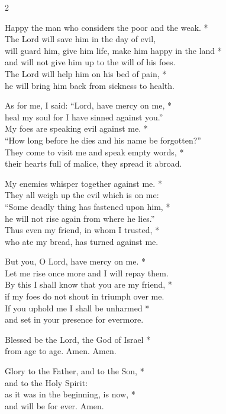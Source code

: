 \begin{multicols}{2}

    Happy the man who considers the poor and the weak. *\\
    The Lord will save him in the day of evil,\\
    will guard him, give him life, make him happy in the land *\\
    and will not give him up to the will of his foes.\\
    The Lord will help him on his bed of pain, *\\
    he will bring him back from sickness to health.
    
    As for me, I said: “Lord, have mercy on me, *\\
    heal my soul for I have sinned against you.”\\
    My foes are speaking evil against me. *\\
    “How long before he dies and his name be forgotten?”\\
    They come to visit me and speak empty words, *\\
    their hearts full of malice, they spread it abroad.
    
    My enemies whisper together against me. *\\
    They all weigh up the evil which is on me:\\
    “Some deadly thing has fastened upon him, *\\
    he will not rise again from where he lies.”\\
    Thus even my friend, in whom I trusted, *\\
    who ate my bread, has turned against me.
    
    But you, O Lord, have mercy on me. *\\
    Let me rise once more and I will repay them.\\
    By this I shall know that you are my friend, *\\
    if my foes do not shout in triumph over me.\\
    If you uphold me I shall be unharmed *\\
    and set in your presence for evermore.
    
    Blessed be the Lord, the God of Israel *\\
    from age to age. Amen. Amen.
    
    Glory to the Father, and to the Son, *\\
    and to the Holy Spirit:\\
    as it was in the beginning, is now, *\\
    and will be for ever. Amen.

\end{multicols}
